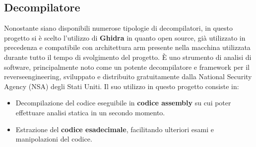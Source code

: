 \subsection{Decompilatore}
Nonostante siano disponibili numerose tipologie di decompilatori, in questo progetto si è scelto l'utilizzo di \textbf{Ghidra} in quanto open source, già utilizzato in precedenza e compatibile con architettura arm presente nella macchina utilizzata durante tutto il tempo di svolgimento del progetto. È uno strumento di analisi di software, principalmente noto come un potente decompilatore e framework per il \gls{reverseengineering}, sviluppato e distribuito gratuitamente dalla National Security Agency (NSA) degli Stati Uniti. Il suo utilizzo in questo progetto consiste in:
\begin{itemize}
    \item Decompilazione del codice eseguibile in \textbf{codice assembly} su cui poter effettuare analisi statica in un secondo momento. 
    \item Estrazione del \textbf{codice esadecimale}, facilitando ulteriori esami e manipolazioni del codice.
\end{itemize}

